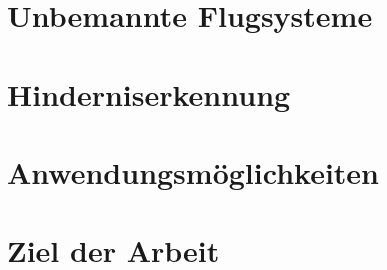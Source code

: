 \section{Unbemannte Flugsysteme}
\label{sec:uav}



\section{Hinderniserkennung}
\label{sec:obstacle_detection}



\section{Anwendungsmöglichkeiten}
\label{sec:applications}



\section{Ziel der Arbeit}
\label{sec:ziel_der_arbeit}
